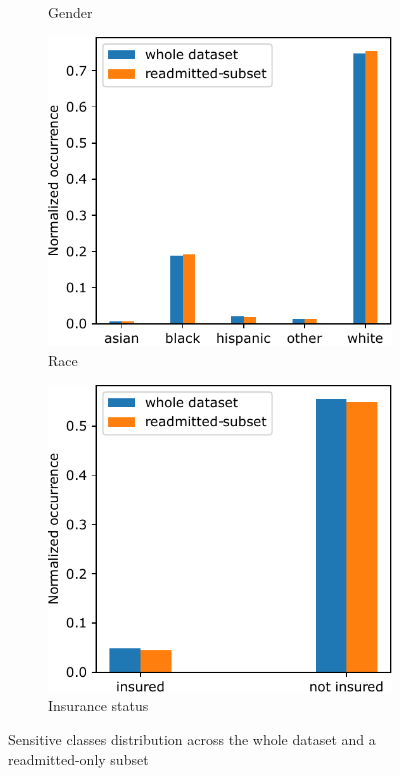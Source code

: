 \documentclass[a4paper,11pt]{article}
\begin{document}
\begin{figure}[htb]
\begin{subfigure}{0.24\textwidth}
    \caption{Gender}
    \label{fig:discrim_global_gender}
\end{subfigure}
\hfill
\begin{subfigure}{0.24\textwidth}
    \includegraphics[width=\textwidth]{images/discrim_global_race.pdf}
    \caption{Race}
    \label{fig:discrim_global_race}
\end{subfigure}
\hfill
\begin{subfigure}{0.24\textwidth}
    \includegraphics[width=\textwidth]{images/discrim_global_is_insured.pdf}
    \caption{Insurance status}
    \label{fig:discrim_global_is_insured}
\end{subfigure}
\caption{Sensitive classes distribution across the whole dataset and a readmitted-only subset}
\label{fig:discrim_global}
\end{figure}
\end{document}

